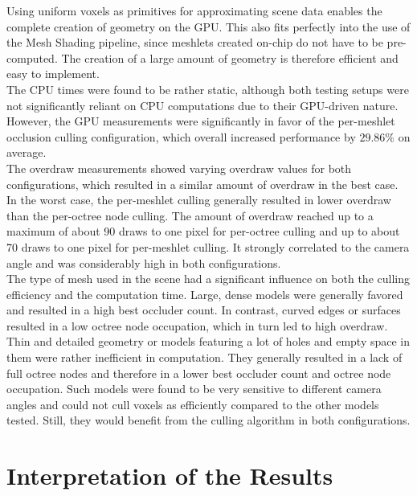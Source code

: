 \noindent
Using uniform voxels as primitives for approximating scene data enables the complete creation of geometry on the 
\ac{GPU}. This also fits perfectly into the use of the Mesh Shading pipeline, since meshlets created on-chip do 
not have to be pre-computed. The creation of a large amount of geometry is therefore efficient and easy to 
implement. \\

\noindent
The \ac{CPU} times were found to be rather static, although both testing setups were not significantly reliant 
on \ac{CPU} computations due to their \ac{GPU}-driven nature. However, the \ac{GPU} measurements were significantly 
in favor of the per-meshlet occlusion culling configuration, which overall increased performance by $29.86\%$ on 
average. \\

\noindent
The overdraw measurements showed varying overdraw values for both configurations, which resulted in a similar amount 
of overdraw in the best case. In the worst case, the per-meshlet culling generally resulted in lower overdraw than 
the per-octree node culling. The amount of overdraw reached up to a maximum of about 90 draws to one pixel for 
per-octree culling and up to about 70 draws to one pixel for per-meshlet culling. It strongly correlated to the 
camera angle and was considerably high in both configurations. \\ 

\noindent
The type of mesh used in the scene had a significant influence on both the culling efficiency and the computation time.
Large, dense models were generally favored and resulted in a high best occluder count. In contrast, curved edges or 
surfaces resulted in a low octree node occupation, which in turn led to high overdraw. Thin and detailed geometry or 
models featuring a lot of holes and empty space in them were rather inefficient in computation. They generally resulted 
in a lack of full octree nodes and therefore in a lower best occluder count and octree node occupation. Such models 
were found to be very sensitive to different camera angles and could not cull voxels as efficiently compared to the 
other models tested. Still, they would benefit from the culling algorithm in both configurations.

\section{Interpretation of the Results}

